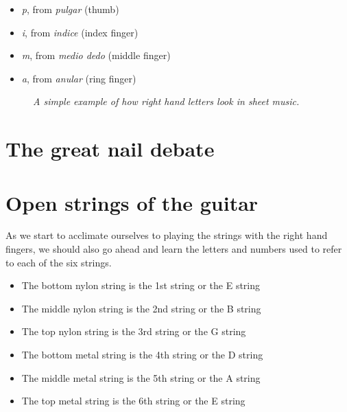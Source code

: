 \begin{itemize}
	
	\item \textit{p}, from \textit{pulgar} (thumb)
	
	\item \textit{i}, from \textit{indice} (index finger)
	
	\item \textit{m}, from \textit{medio dedo} (middle finger)
	
	\item \textit{a}, from \textit{anular} (ring finger)
	
\end{itemize}


\begin{figure}[h]
	\begin{center}
		\large
		\caption{\textit{A simple example of how right hand letters look in sheet music.}}
	\end{center}
\end{figure}

\section{The great nail debate}

\section{Open strings of the guitar}

As we start to acclimate ourselves to playing the strings with the right hand fingers, we should also go ahead and learn the letters and numbers used to refer to each of the six strings. 

\begin{itemize}
	\item The bottom nylon string is the 1st string or the E string
	\item The middle nylon string is the 2nd string or the B string
	\item The top nylon string is the 3rd string or the G string
	\item The bottom metal string is the 4th string or the D string
	\item The middle metal string is the 5th string or the A string
	\item The top metal string is the 6th string or the E string
\end{itemize}

